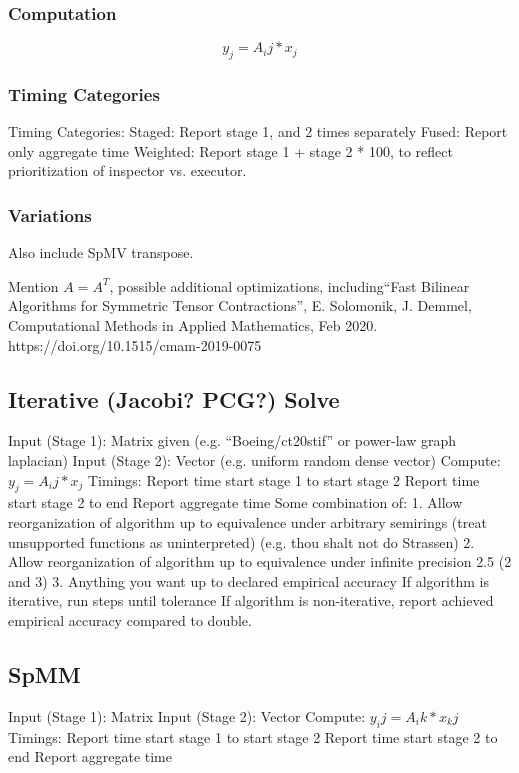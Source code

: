 \documentclass{article}
\begin{document}
\subsubsection{Computation}
$$y_j = A_ij * x_j$$
\subsubsection{Timing Categories}

	Timing Categories:
Staged: Report stage 1, and 2 times separately
Fused: Report only aggregate time
Weighted: Report stage 1 + stage 2 * 100, to reflect prioritization of inspector vs. executor.
\subsubsection{Variations}
    Also include SpMV transpose.

    Mention $A=A^T$, possible additional optimizations,
    including``Fast Bilinear Algorithms for Symmetric Tensor 
    Contractions'', E. Solomonik, J. Demmel, Computational Methods
    in Applied Mathematics, Feb 2020.
    \newline
    https://doi.org/10.1515/cmam-2019-0075



\subsection{Iterative (Jacobi? PCG?) Solve}
	Input (Stage 1):
		Matrix given (e.g. “Boeing/ct20stif” or power-law graph laplacian)
	Input (Stage 2):
		Vector (e.g. uniform random dense vector)
	Compute:
		$y_j = A_ij * x_j$
	Timings:
Report time start stage 1 to start stage 2
Report time start stage 2 to end
Report aggregate time
Some combination of:
1. Allow reorganization of algorithm up to equivalence under arbitrary semirings (treat unsupported functions as uninterpreted) (e.g. thou shalt not do Strassen)
2. Allow reorganization of algorithm up to equivalence under infinite precision
2.5 (2 and 3)
3. Anything you want up to declared empirical accuracy
If algorithm is iterative, run steps until tolerance
If algorithm is non-iterative, report achieved empirical accuracy compared to double.

\subsection{SpMM}
	Input (Stage 1):
		Matrix
	Input (Stage 2):
		Vector
	Compute:
		$y_ij = A_ik * x_kj$
	Timings:
Report time start stage 1 to start stage 2
Report time start stage 2 to end
Report aggregate time
\end{document}
